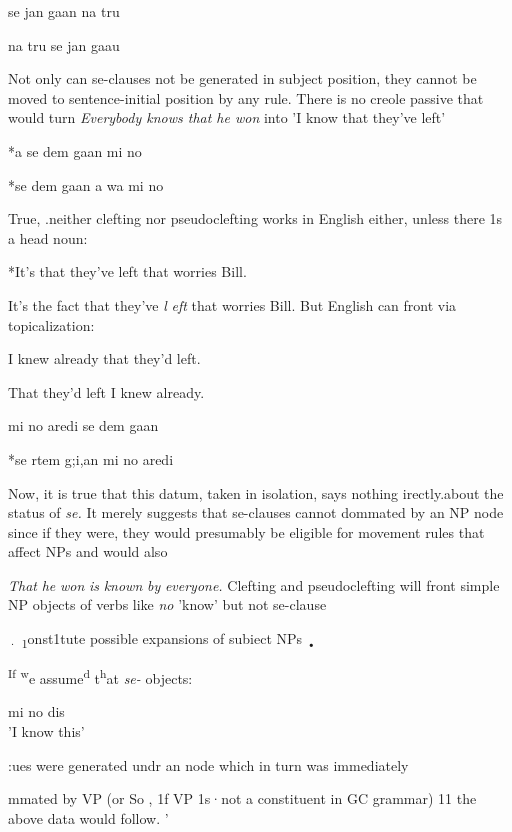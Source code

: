 \ea\label{ex:167}
se jan gaan na tru
\z

\ea\label{ex:168}
na tru se jan gaau
\z

Not only can se-clauses not be generated in subject position, they cannot be moved to sentence-initial position by any rule. There is no creole passive that would turn \textit{Everybody knows that he won} into
'I know that they've left'

\ea\label{ex:173}
*a se dem gaan mi no
\z

\ea\label{ex:174}
 *se dem gaan a wa mi no
\z

True, .neither clefting nor pseudoclefting works in English either, unless there 1s a head noun:

\ea\label{ex:175}
 *It's that they've left that worries Bill.
\z

\ea\label{ex:176}
 It's the fact that they've \textit{l} \textit{eft} that worries Bill. But English can front via topicalization:
\z

\ea\label{ex:177}
 I knew already that they'd left.
\z

\ea\label{ex:178}
 That they'd left I knew already.
\z

\ea\label{ex:179}
 mi no aredi se dem gaan
\z

\ea\label{ex:180}
 *se rtem g;i,an mi no aredi
\z

Now, it is true that this datum, taken in isolation, says nothing irectly.about the status of \textit{se.} It merely suggests that se-clauses cannot dommated by an NP node since if they were, they would presumably be eligible for movement rules that affect NPs and would also

\textit{That} \textit{he} \textit{won} \textit{is} \textit{k}\textit{nown} \textit{by} \textit{everyone.} Clefting and pseudoclefting will
front simple NP objects of verbs like \textit{no }'know' but not se-clause 

\textsubscript{·} \textsubscript{1}onst1tute possible expansions of subiect NPs \textsubscript{•}

\textsuperscript{If} \textsuperscript{w}e assume\textsuperscript{d} t\textsuperscript{h}at \textit{se-}
objects:

\ea\label{ex:169}
 mi no dis\\
\glt  'I know this'
\z



:ues were generated undr an node which in turn was immediately

mmated by VP (or So , 1f VP 1s·not a constituent in GC grammar) 11 the above data would follow. '

